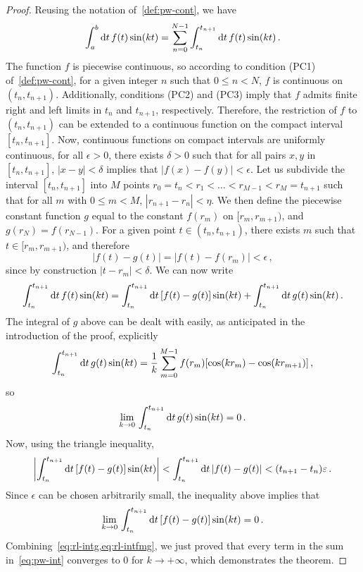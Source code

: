 \begin{proof}
	Reusing the notation of~\cref{def:pw-cont}, we have
	\begin{equation}
		\int_a^b\mathrm{d} t\, f(t)\sin(kt)
		=\sum_{n=0}^{N-1}\int_{t_n}^{t_{n+1}}\mathrm{d} t\, f(t)\sin(kt)\,.
		\label{eq:pw-int}
	\end{equation}
	The function $f$ is piecewise continuous, so according to condition (PC1)
	of~\cref{def:pw-cont}, for a given integer $n$ such that $0\leq n<N$, $f$ is continuous
	on $(t_n,t_{n+1})$. Additionally, conditions (PC2) and (PC3) imply that $f$ admits
	finite right and left limits in $t_n$ and $t_{n+1}$, respectively. Therefore, the
	restriction of $f$ to $(t_n,t_{n+1})$ can be extended to a continuous function on the
	compact interval $[t_n,t_{n+1}]$. Now, continuous functions on compact intervals are
	uniformly continuous, \ie for all $\epsilon>0$, there exists $\delta>0$ such that for
	all pairs $x,y$ in $[t_n,t_{n+1}]$, $|x-y|<\delta$ implies that $|f(x)-f(y)|<\epsilon$.
	Let us subdivide the interval $[t_n,t_{n+1}]$ into $M$ points
	$r_0=t_n<r_1<\dots<r_{M-1}<r_M=t_{n+1}$ such that for all $m$ with $0\leq m<M$,
	$|r_{n+1}-r_n|<\eta$. We then define the piecewise constant function $g$ equal to the
	constant $f(r_m)$ on $[r_m,r_{m+1})$, and $g(r_N)=f(r_{N-1})$. For a given point
	$t\in(t_n,t_{n+1})$, there exists $m$ such that $t\in[r_m,r_{m+1})$, and therefore
	\begin{equation}
		|f(t)-g(t)|=|f(t)-f(r_m)|<\epsilon\,,
	\end{equation}
	since by construction $|t-r_m|<\delta$. We can now write
	\begin{equation}
		\int_{t_n}^{t_{n+1}}\mathrm{d} t\, f(t)\sin(kt)
		=\int_{t_n}^{t_{n+1}}\mathrm{d} t\, [f(t)-g(t)]\sin(kt)
		+\int_{t_n}^{t_{n+1}}\mathrm{d} t\,g(t)\sin(kt)\,.
	\end{equation}
	The integral of $g$ above can be dealt with easily, as anticipated in the introduction
	of the proof, explicitly
	\begin{equation}
		\int_{t_n}^{t_{n+1}}\mathrm{d} t\,g(t)\sin(kt)
		=\frac{1}{k}\sum_{m=0}^{M-1}f(r_m)[\cos(kr_m)-\cos(kr_{m+1})]\,,
	\end{equation}
	so
	\begin{equation}
		\lim_{k\to0}\,\int_{t_n}^{t_{n+1}}\mathrm{d} t\,g(t)\sin(kt)=0\,.
		\label{eq:rl-intg}
	\end{equation}
	Now, using the triangle inequality,
	\begin{equation}
		\left|\int_{t_n}^{t_{n+1}}\mathrm{d} t\, [f(t)-g(t)]\sin(kt)\right|<
		\int_{t_n}^{t_{n+1}}\mathrm{d} t\, |f(t)-g(t)|<(t_{n+1}-t_n)\varepsilon\,.
	\end{equation}
	Since $\epsilon$ can be chosen arbitrarily small, the inequality above implies that
	\begin{equation}
		\lim_{k\to0}\,\int_{t_n}^{t_{n+1}}\mathrm{d} t\, [f(t)-g(t)]\sin(kt)=0\,.
		\label{eq:rl-intfmg}
	\end{equation}
	Combining~\cref{eq:rl-intg,eq:rl-intfmg}, we just proved that every term in the sum
	in~\cref{eq:pw-int} converges to $0$ for $k\to+\infty$, which demonstrates the theorem.
\end{proof}
